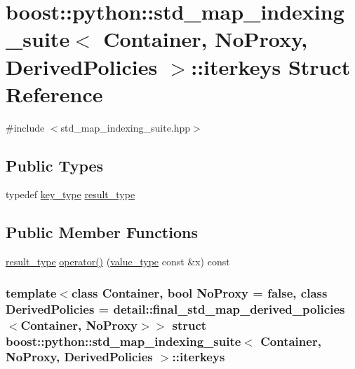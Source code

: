 \hypertarget{structboost_1_1python_1_1std__map__indexing__suite_1_1iterkeys}{\section{boost\-:\-:python\-:\-:std\-\_\-map\-\_\-indexing\-\_\-suite$<$ \-Container, \-No\-Proxy, \-Derived\-Policies $>$\-:\-:iterkeys \-Struct \-Reference}
\label{structboost_1_1python_1_1std__map__indexing__suite_1_1iterkeys}
}


{\ttfamily \#include $<$std\-\_\-map\-\_\-indexing\-\_\-suite.\-hpp$>$}

\subsection*{\-Public \-Types}
\begin{DoxyCompactItemize}
\item 
typedef \hyperlink{classboost_1_1python_1_1std__map__indexing__suite_a4e2daeb60a58d6ce9964e0ea27680009}{key\-\_\-type} \hyperlink{structboost_1_1python_1_1std__map__indexing__suite_1_1iterkeys_a7c12b5aeae081d2ecf524e29e5a5c343}{result\-\_\-type}
\end{DoxyCompactItemize}
\subsection*{\-Public \-Member \-Functions}
\begin{DoxyCompactItemize}
\item 
\hyperlink{structboost_1_1python_1_1std__map__indexing__suite_1_1iterkeys_a7c12b5aeae081d2ecf524e29e5a5c343}{result\-\_\-type} \hyperlink{structboost_1_1python_1_1std__map__indexing__suite_1_1iterkeys_a0e3b853fc4bbcc4777e5c663cc8bdd60}{operator()} (\hyperlink{classboost_1_1python_1_1std__map__indexing__suite_aff9ed68cf30e805a04a313d92c62ab38}{value\-\_\-type} const \&x) const 
\end{DoxyCompactItemize}
\subsubsection*{template$<$class \-Container, bool \-No\-Proxy = false, class \-Derived\-Policies = detail\-::final\-\_\-std\-\_\-map\-\_\-derived\-\_\-policies$<$\-Container, No\-Proxy$>$$>$ struct boost\-::python\-::std\-\_\-map\-\_\-indexing\-\_\-suite$<$ Container, No\-Proxy, Derived\-Policies $>$\-::iterkeys}



